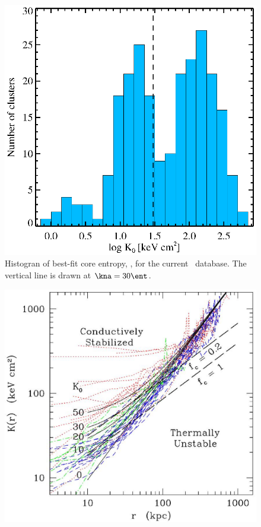 \documentclass[letterpaper,11pt]{article}
\begin{document}
\begin{center}
\begin{figure}[htp]
  \includegraphics*[width=\columnwidth, trim=28mm 5mm 30mm 17mm, clip]{k0hist}
  \caption{Histogran of best-fit core entropy, \kna, for the
    current \accept\ database. The vertical line is drawn at
    $\kna=30 \ent$.}
  \label{fig:hist}
\end{figure}
\begin{figure}[htp]
  \includegraphics*[width=\columnwidth, trim=0mm 0mm 0mm 0mm, clip]{cond1}

\end{figure}
\end{center}
\end{document}
